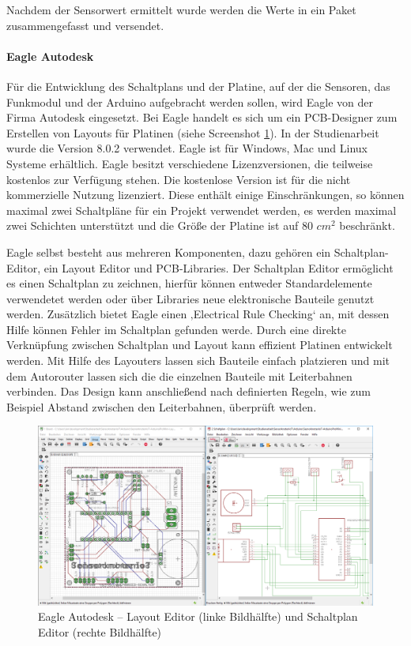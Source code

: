 Nachdem der Sensorwert ermittelt wurde werden die Werte in ein Paket zusammengefasst und versendet.  
\paragraph{Eagle Autodesk} Für die Entwicklung des Schaltplans und der Platine, auf der die Sensoren,  das Funkmodul und der Arduino aufgebracht werden sollen, wird Eagle von der Firma Autodesk eingesetzt.  Bei Eagle handelt es sich um ein \ac{PCB}-Designer zum Erstellen von Layouts für Platinen (siehe Screenshot \ref{img:EagleAutodesk}). In der Studienarbeit wurde die Version 8.0.2 verwendet. Eagle ist für Windows, Mac und Linux Systeme erhältlich. Eagle besitzt verschiedene Lizenzversionen, die teilweise kostenlos zur Verfügung stehen. Die kostenlose Version ist für die nicht kommerzielle Nutzung lizenziert. Diese enthält einige Einschränkungen, so können maximal zwei Schaltpläne für ein Projekt verwendet werden, es werden maximal zwei Schichten unterstützt und die Größe der Platine ist auf 80 $cm^{2}$ beschränkt.

Eagle selbst besteht aus mehreren Komponenten, dazu gehören ein Schaltplan-Editor, ein Layout Editor und \ac{PCB}-Libraries. Der Schaltplan Editor ermöglicht es einen Schaltplan zu zeichnen, hierfür können entweder Standardelemente verwendetet werden oder über Libraries neue elektronische Bauteile genutzt werden. Zusätzlich bietet Eagle einen ‚Electrical Rule Checking‘ an, mit dessen Hilfe können Fehler im Schaltplan gefunden werde. Durch eine direkte Verknüpfung zwischen Schaltplan und Layout kann effizient Platinen entwickelt werden. Mit Hilfe des Layouters lassen sich Bauteile einfach platzieren und mit dem Autorouter lassen sich die die einzelnen Bauteile mit Leiterbahnen verbinden. Das Design kann anschließend nach definierten Regeln, wie zum Beispiel Abstand zwischen den Leiterbahnen, überprüft werden. 
\begin{figure}
	\centering
	\includegraphics[width=1\textwidth]{bilder/Eagle}
	\caption[Eagle Autodesk – Layout Editor und Schaltplan Editor]{Eagle Autodesk – Layout Editor (linke Bildhälfte) und Schaltplan Editor (rechte Bildhälfte)}
	\label{img:EagleAutodesk}
\end{figure}

